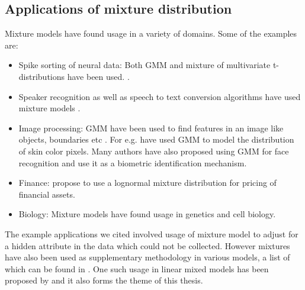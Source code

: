 \subsection{Applications of mixture distribution}
Mixture models have found usage in a variety of domains. Some of the examples are:
\begin{itemize}
\item Spike sorting of neural data: Both GMM and mixture of multivariate t-distributions have been used. \citep{lewicki_bayesian_1994,shoham_robust_2003}.
\item Speaker recognition as well as speech to text conversion algorithms have used mixture models \citep{simancas-acevedo_speaker_2001,xiang_efficient_2003,povey_subspace_2011}.
\item Image processing: GMM have been used to find features in an image like objects, boundaries etc \citep{fu_color_2012}. For e.g. \citet{ming-hsuan_yang_gaussian_1998} have used GMM to model the distribution of skin color pixels. Many authors have also proposed using GMM for face recognition and use it as a biometric identification mechanism.
\item Finance: \citet{brigo_lognormal-mixture_2002} propose to use a lognormal mixture distribution for pricing of financial assets.
\item Biology: Mixture models have found usage in genetics and cell biology.\citep{sim_evaluating_2012,gianola_mixture_2007} 
\end{itemize}


The example applications we cited involved usage of mixture model to adjust for a hidden attribute in the data which could not be collected. However mixtures have also been used as supplementary methodology in various models, a list of which can be found in \citet[pg. 238]{fruhwirth-schnatter_finite_2013}. One such usage in linear mixed models has been proposed by \citet{verbeke_linear_1996} and it also forms the theme of this thesis.

